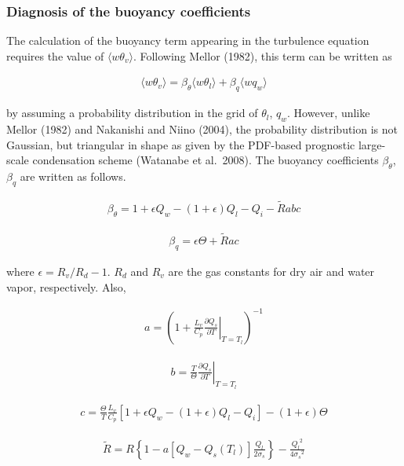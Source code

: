 \hypertarget{diagnosis-of-the-buoyancy-coefficients}{%
\subsubsection{Diagnosis of the buoyancy
coefficients}\label{diagnosis-of-the-buoyancy-coefficients}}

The calculation of the buoyancy term appearing in the turbulence
equation requires the value of \(\langle w\theta_v \rangle\). Following
Mellor (1982), this term can be written as

\begin{eqnarray}\langle w\theta_v \rangle=\beta_\theta \langle w\theta_l \rangle + \beta_q \langle wq_w \rangle\end{eqnarray}

by assuming a probability distribution in the grid of \(\theta_l\),
\(q_w\). However, unlike Mellor (1982) and Nakanishi and Niino (2004),
the probability distribution is not Gaussian, but triangular in shape as
given by the PDF-based prognostic large-scale condensation scheme
(Watanabe et al.~2008). The buoyancy coefficients \(\beta_\theta\),
\(\beta_q\) are written as follows.

\begin{eqnarray}\beta_\theta=1+\epsilon Q_w-(1+\epsilon)Q_l-Q_i-\tilde{R}abc\end{eqnarray}

\begin{eqnarray}\beta_q=\epsilon \Theta +\tilde{R}ac\end{eqnarray}

where \(\epsilon=R_v/R_d-1\). \(R_d\) and \(R_v\) are the gas constants
for dry air and water vapor, respectively. Also,

\begin{eqnarray}a=\left(1+\frac{L_v}{C_p}\left.\frac{\partial Q_s}{\partial T}\right|_{T=T_l}\right)^{-1}\end{eqnarray}

\begin{eqnarray}b=\frac{T}{\Theta}\left.\frac{\partial Q_s}{\partial T}\right|_{T=T_l}\end{eqnarray}

\begin{eqnarray}c=\frac{\Theta}{T}\frac{L_v}{C_p}\left[1+\epsilon Q_w-(1+\epsilon)Q_l-Q_i\right]-(1+\epsilon)\Theta\end{eqnarray}

\begin{eqnarray}\tilde{R}=R\left\{1-a\left[Q_w-Q_s(T_l)\right]\frac{Q_l}{2\sigma_s}\right\}-\frac{{Q_l}^2}{4{\sigma_s}^2}\end{eqnarray}


